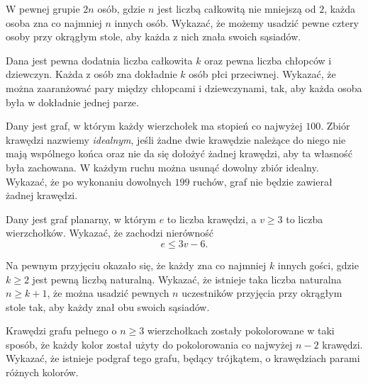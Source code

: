 \begin{problem}{1}
	W pewnej grupie $2n$ osób, gdzie $n$ jest liczbą całkowitą nie mniejszą od $2$, każda osoba zna co najmniej $n$ innych osób. Wykazać, że możemy usadzić pewne cztery osoby przy okrągłym stole, aby każda z nich znała swoich sąsiadów.
\end{problem}

\begin{problem}{2}
	Dana jest pewna dodatnia liczba całkowita $k$ oraz pewna liczba chłopców i dziewczyn. Każda z osób zna dokładnie $k$ osób płci przeciwnej. Wykazać, że można zaaranżować pary między chłopcami i dziewczynami, tak, aby każda osoba była w dokładnie jednej parze.
\end{problem}

\begin{problem}{3}
	Dany jest graf, w którym każdy wierzchołek ma stopień co najwyżej $100$. Zbiór krawędzi nazwiemy \textit{idealnym}, jeśli żadne dwie krawędzie należące do niego nie mają wspólnego końca oraz nie da się dołożyć żadnej krawędzi, aby ta własność była zachowana. W każdym ruchu można usunąć dowolny zbiór idealny. Wykazać, że po wykonaniu dowolnych $199$ ruchów, graf nie będzie zawierał żadnej krawędzi.
\end{problem}

\begin{problem}{4}
	Dany jest graf planarny, w którym $e$ to liczba krawędzi, a $v \geqslant 3$ to liczba wierzchołków. Wykazać, że zachodzi nierówność
	\[
		e \leqslant 3v - 6.
	\]
\end{problem}

\begin{problem}{5}
	Na pewnym przyjęciu okazało się, że każdy zna co najmniej $k$ innych gości, gdzie $k \geqslant 2$ jest pewną liczbą naturalną. Wykazać, że istnieje taka liczba naturalna $n\geqslant k + 1$, że można usadzić pewnych $n$ uczestników przyjęcia przy okrągłym stole tak, aby każdy znał obu swoich sąsiadów.
\end{problem}

\begin{problem}{6}
	Krawędzi grafu pełnego o $n \geqslant 3$ wierzchołkach zostały pokolorowane w taki sposób, że każdy kolor został użyty do pokolorowania co najwyżej $n - 2$ krawędzi. Wykazać, że istnieje podgraf tego grafu, będący trójkątem, o krawędziach parami różnych kolorów.
\end{problem}

